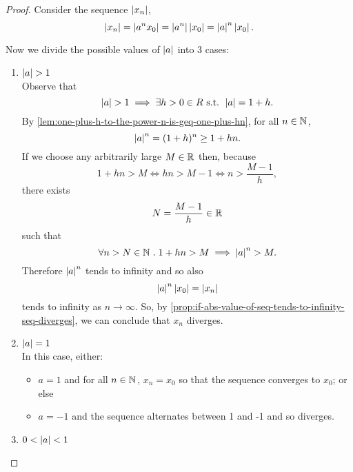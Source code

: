 \documentclass[../MathsNotesBase.tex]{subfiles}
\begin{document}
{		\bigskip
		\begin{proof}
			Consider the sequence $\left\lvert x_n\right\rvert$, 
			\[ \left\lvert x_n\right\rvert = \left\lvert a^n x_0\right\rvert = \left\lvert a^n\right\rvert \left\lvert x_0\right\rvert = \left\lvert a\right\rvert^n \left\lvert x_0\right\rvert. \]
			
			Now we divide the possible values of $\left\lvert a\right\rvert$ into 3 cases:
			\begin{enumerate}[label=(\roman*)]
				\item{${ \left\lvert a\right\rvert > 1 }$\\
					
					Observe that
					\[ \left\lvert a\right\rvert > 1 \implies \exists h > 0 \in R{} \text{ s.t. } \left\lvert a\right\rvert = 1 + h. \]
					By \autoref{lem:one-plus-h-to-the-power-n-is-geq-one-plus-hn}, for all ${ n \in \mathbb{N}^{} }$,
					\[ \left\lvert a\right\rvert^n = (1 + h)^n \geq 1 + hn. \]
					If we choose any arbitrarily large ${ M \in \mathbb{R}^{} }$ then, because
					\[ 1 + hn > M \iff hn > M - 1 \iff n > \frac{M - 1}{h}, \]
					there exists
					\[ N = \frac{M - 1}{h} \in \mathbb{R}^{} \]
					such that
					\[ \forall n > N \in \mathbb{N}^{} \;.\; 1 + hn > M \implies \left\lvert a\right\rvert^n > M. \]
					Therefore $\left\lvert a\right\rvert^n$ tends to infinity and so also
					\[ \left\lvert a\right\rvert^n \left\lvert x_0\right\rvert = \left\lvert x_n\right\rvert \]
					tends to infinity as ${ n \to \infty }$. So, by \autoref{prop:if-abs-value-of-seq-tends-to-infinity-seq-diverges}, we can conclude that $x_n$ diverges.
				}
				\bigskip
				\item{${ \left\lvert a\right\rvert = 1 }$\\
					
					In this case, either:
					\begin{itemize}
						\item{${ a = 1 }$ and for all ${ n \in \mathbb{N}^{} }$, ${ x_n = x_0 }$ so that the sequence converges to $x_0$; or else}
						\item{${ a = -1 }$ and the sequence alternates between 1 and -1 and so diverges.}
					\end{itemize} 
				}
				\bigskip
				\item{${ 0 < \left\lvert a\right\rvert < 1 }$\\
					
}
\end{enumerate}
\end{proof}}
\end{document}
